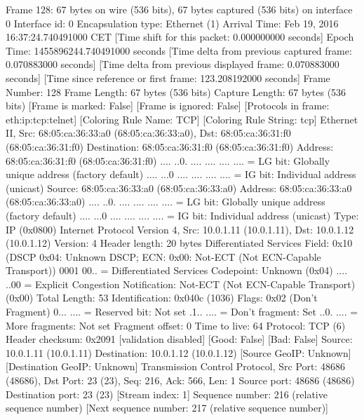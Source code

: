 Frame 128: 67 bytes on wire (536 bits), 67 bytes captured (536 bits) on interface 0
    Interface id: 0
    Encapsulation type: Ethernet (1)
    Arrival Time: Feb 19, 2016 16:37:24.740491000 CET
    [Time shift for this packet: 0.000000000 seconds]
    Epoch Time: 1455896244.740491000 seconds
    [Time delta from previous captured frame: 0.070883000 seconds]
    [Time delta from previous displayed frame: 0.070883000 seconds]
    [Time since reference or first frame: 123.208192000 seconds]
    Frame Number: 128
    Frame Length: 67 bytes (536 bits)
    Capture Length: 67 bytes (536 bits)
    [Frame is marked: False]
    [Frame is ignored: False]
    [Protocols in frame: eth:ip:tcp:telnet]
    [Coloring Rule Name: TCP]
    [Coloring Rule String: tcp]
Ethernet II, Src: 68:05:ca:36:33:a0 (68:05:ca:36:33:a0), Dst: 68:05:ca:36:31:f0 (68:05:ca:36:31:f0)
    Destination: 68:05:ca:36:31:f0 (68:05:ca:36:31:f0)
        Address: 68:05:ca:36:31:f0 (68:05:ca:36:31:f0)
        .... ..0. .... .... .... .... = LG bit: Globally unique address (factory default)
        .... ...0 .... .... .... .... = IG bit: Individual address (unicast)
    Source: 68:05:ca:36:33:a0 (68:05:ca:36:33:a0)
        Address: 68:05:ca:36:33:a0 (68:05:ca:36:33:a0)
        .... ..0. .... .... .... .... = LG bit: Globally unique address (factory default)
        .... ...0 .... .... .... .... = IG bit: Individual address (unicast)
    Type: IP (0x0800)
Internet Protocol Version 4, Src: 10.0.1.11 (10.0.1.11), Dst: 10.0.1.12 (10.0.1.12)
    Version: 4
    Header length: 20 bytes
    Differentiated Services Field: 0x10 (DSCP 0x04: Unknown DSCP; ECN: 0x00: Not-ECT (Not ECN-Capable Transport))
        0001 00.. = Differentiated Services Codepoint: Unknown (0x04)
        .... ..00 = Explicit Congestion Notification: Not-ECT (Not ECN-Capable Transport) (0x00)
    Total Length: 53
    Identification: 0x040c (1036)
    Flags: 0x02 (Don't Fragment)
        0... .... = Reserved bit: Not set
        .1.. .... = Don't fragment: Set
        ..0. .... = More fragments: Not set
    Fragment offset: 0
    Time to live: 64
    Protocol: TCP (6)
    Header checksum: 0x2091 [validation disabled]
        [Good: False]
        [Bad: False]
    Source: 10.0.1.11 (10.0.1.11)
    Destination: 10.0.1.12 (10.0.1.12)
    [Source GeoIP: Unknown]
    [Destination GeoIP: Unknown]
Transmission Control Protocol, Src Port: 48686 (48686), Dst Port: 23 (23), Seq: 216, Ack: 566, Len: 1
    Source port: 48686 (48686)
    Destination port: 23 (23)
    [Stream index: 1]
    Sequence number: 216    (relative sequence number)
    [Next sequence number: 217    (relative sequence number)]
